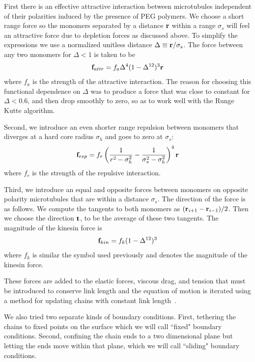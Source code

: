 \documentclass[11pt]{ucthesis}
\def\br{{\bf r}}
\begin{document}
First there is an effective attractive interaction between microtubules independent of 
their polarities induced by the presence of PEG polymers. We choose a short range force so the monomers separated by a
distance $\br$  within a range $\sigma_s$ will feel an attractive force due to
depletion forces as discussed above. To
simplify the expressions we use a normalized unitless distance $\Delta \equiv
\br/\sigma_s$.
The force between any two monomers for $\Delta < 1$ is taken to be
\begin{equation}
{\bf f}_{attr} = f_a \Delta^4 (1-\Delta^{12})^3 \br
\end{equation}
where $f_a$ is the strength of the attractive interaction.
The reason for choosing this functional dependence on $\Delta$ was to produce
a force that was close to constant for $\Delta < 0.6$, and then drop
smoothly to zero, so as to work well with the Runge Kutte algorithm.

Second, we introduce an even shorter range repulsion between monomers
that diverges at a hard core radius $\sigma_h$ and goes to zero at $\sigma_s$:
\begin{equation}
{\bf f}_{rep} = f_r\left(\frac{1}{r^2-\sigma_h^2}- \frac{1}{\sigma_s^2-\sigma_h^2}\right)^4 \br 
\end{equation}
where $f_r$ is the strength of the repulsive interaction.

Third, we introduce an equal and opposite forces between monomers on opposite polarity microtubules
that are within a distance $\sigma_s$.
The direction of the force is as follows. We compute the tangents to both
monomers as $(\br_{i+1}-\br_{i-1})/2$. Then we choose the direction $\bf t$, to be the
average of these two tangents. The magnitude of the kinesin force is
\begin{equation}
{\bf f}_{kin} = f_k (1-\Delta^{12})^3 
\end{equation}
where $f_k$ is similar the symbol used previously and denotes the magnitude of
the kinesin force.

These forces are added to the elastic forces, viscous drag, and tension that
must be introduced to conserve link length and the equation of motion is iterated
using a method for updating chains with constant link length~\cite{deutsch1988theoretical,deutsch1989theoretical}.

We also tried two separate kinds of boundary conditions. First, tethering the chains to
fixed points on the surface which we will call ``fixed" boundary conditions. Second, confining the chain ends to a two
dimensional plane but letting the ends move within that plane, which we will
call ``sliding" boundary conditions. 
\end{document}

